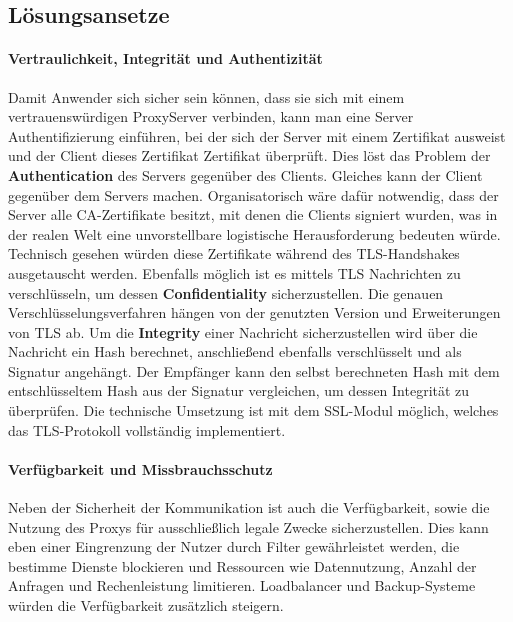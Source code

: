 \documentclass[12pt, a4paper]{scrartcl}
\begin{document}
\subsection{Lösungsansetze}
\paragraph{Vertraulichkeit, Integrität und Authentizität}
Damit Anwender sich sicher sein können, dass sie sich mit einem vertrauenswürdigen ProxyServer verbinden, kann man eine Server Authentifizierung einführen, bei der sich der Server mit einem Zertifikat ausweist und der Client dieses Zertifikat Zertifikat überprüft. Dies löst das Problem der \textbf{Authentication} des Servers gegenüber des Clients. Gleiches kann der Client gegenüber dem Servers machen. Organisatorisch wäre dafür notwendig, dass der Server alle CA-Zertifikate besitzt, mit denen die Clients signiert wurden, was in der realen Welt eine unvorstellbare logistische Herausforderung bedeuten würde.\newline
Technisch gesehen würden diese Zertifikate während des \ac{TLS}-Handshakes ausgetauscht werden. Ebenfalls möglich ist es mittels \ac{TLS} Nachrichten zu verschlüsseln, um dessen \textbf{Confidentiality} sicherzustellen. Die genauen Verschlüsselungsverfahren hängen von der genutzten Version und Erweiterungen von \ac{TLS} ab.\newline
Um die \textbf{Integrity} einer Nachricht sicherzustellen wird über die Nachricht ein Hash berechnet, anschließend ebenfalls verschlüsselt und als Signatur angehängt. Der Empfänger kann den selbst berechneten Hash mit dem entschlüsseltem Hash aus der Signatur vergleichen, um dessen Integrität zu überprüfen.\newline
Die technische Umsetzung ist mit dem \ac{SSL}-Modul möglich, welches das \ac{TLS}-Protokoll vollständig implementiert.

\paragraph{Verfügbarkeit und Missbrauchsschutz}
Neben der Sicherheit der Kommunikation ist auch die Verfügbarkeit, sowie die Nutzung des Proxys für ausschließlich legale Zwecke sicherzustellen. Dies kann eben einer Eingrenzung der Nutzer durch Filter gewährleistet werden, die bestimme Dienste blockieren und Ressourcen wie Datennutzung, Anzahl der Anfragen und Rechenleistung limitieren. Loadbalancer und Backup-Systeme würden die Verfügbarkeit zusätzlich steigern.
\end{document}
